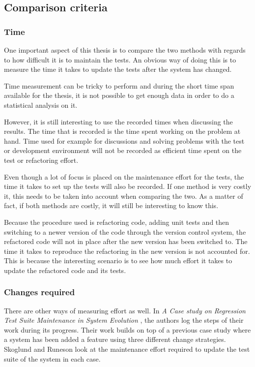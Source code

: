 \documentclass{article}
\begin{document}
		\subsection{Comparison criteria}
			\subsubsection{Time}
			One important aspect of this thesis is to compare the two methods with regards to how difficult it is to maintain the tests. An obvious way of doing this is to measure the time it takes to update the tests after the system has changed. 

			Time measurement can be tricky to perform and during the short time span available for the thesis, it is not possible to get enough data in order to do a statistical analysis on it. 

			However, it is still interesting to use the recorded times when discussing the results. The time that is recorded is the time spent working on the problem at hand. Time used for example for discussions and solving problems with the test or development environment will not be recorded as efficient time spent on the test or refactoring effort.
			
			Even though a lot of focus is placed on the maintenance effort for the tests, the time it takes to set up the tests will also be recorded. If one method is very costly it, this needs to be taken into account when comparing the two. As a matter of fact, if both methods are costly, it will still be interesting to know this.

			Because the procedure used is refactoring code, adding unit tests and then switching to a newer version of the code through the version control system, the refactored code will not in place after the new version has been switched to. The time it takes to reproduce the refactoring in the new version is not accounted for. This is because the interesting scenario is to see how much effort it takes to update the refactored code and its tests. 

			\subsubsection{Changes required}
			There are other ways of measuring effort as well. In {\em A Case study on Regression Test Suite Maintenance in System Evolution} \cite{regression}, the authors log the steps of their work during its progress. 
			Their work builds on top of a previous case study where a system has been added a feature using three different change strategies. Skoglund and Runeson look at the maintenance effort required to update the test suite of the system in each case. 
\end{document}
